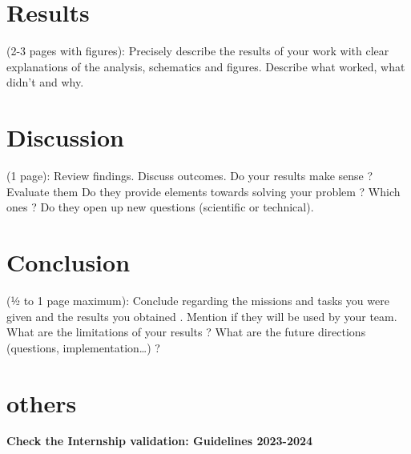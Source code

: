 \documentclass[11pt,a4paper]{article}
\begin{document}
\section{Results}
\begin{displayquote}
    (2-3 pages with figures):
Precisely describe the results of your work with clear explanations of the analysis, schematics and figures.
Describe what worked, what didn’t and why.
\end{displayquote}


\section{Discussion}

\begin{displayquote}
    (1 page): 
Review findings.
Discuss outcomes.
Do your results make sense ? 
Evaluate them
Do they provide elements towards solving your problem ? Which ones ?
Do they open up new questions (scientific or technical).

\end{displayquote}



\section{Conclusion}

\begin{displayquote}
    (½ to 1 page maximum):
    Conclude regarding the missions and tasks you were given and the results you obtained . Mention if they will be used by your team. 
    What are the limitations of your results ?
    What are the future directions (questions, implementation…) ? 
\end{displayquote}    



\section*{others}

\textbf{Check the Internship validation: Guidelines 2023-2024}

\printbibliography
\end{document}

